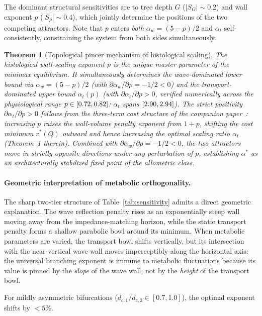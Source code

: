 \documentclass[11pt,a4paper]{article}
\newtheorem{theorem}{Theorem}
\theoremstyle{remark}
\begin{document}
The dominant structural sensitivities are to tree depth $G$ ($|S_G| \sim 0.2$)
and wall exponent $p$ ($|S_p| \sim 0.4$), which jointly determine the positions
of the two competing attractors. Note that $p$ enters \emph{both} $\alpha_w =
(5-p)/2$ and $\alpha_t$ self-consistently, constraining the system from both
sides simultaneously.

\begin{theorem}[Topological pincer mechanism of histological scaling]
\label{thm:master_parameter}
The histological wall-scaling exponent $p$ is the unique master parameter
of the minimax equilibrium. It simultaneously determines the wave-dominated
lower bound via $\alpha_w = (5-p)/2$ (with $\partial\alpha_w/\partial p =
-1/2 < 0$) and the transport-dominated upper bound $\alpha_t(p)$
(with $\partial\alpha_t/\partial p > 0$, verified numerically across the
physiological range $p \in [0.72, 0.82]$: $\alpha_t$ spans
$[2.90, 2.94]$). The strict positivity
$\partial\alpha_t/\partial p > 0$ follows from the
three-term cost structure of the companion paper~\cite{Marchesi2026static}:
increasing $p$ raises the wall-volume penalty exponent from $1+p$,
shifting the cost minimum $r^*(Q)$ outward and hence increasing the
optimal scaling ratio $\alpha_t$ (Theorem~1 therein).
Combined with $\partial\alpha_w/\partial p = -1/2 < 0$, the two attractors
move in strictly opposite directions under any perturbation of $p$,
establishing $\alpha^*$ as an architecturally stabilized fixed point of the
allometric class.
\end{theorem}

\paragraph{Geometric interpretation of metabolic orthogonality.}
The sharp two-tier structure of Table~\ref{tab:sensitivity} admits a direct
geometric explanation. The wave reflection penalty rises as an
exponentially steep wall moving away from the impedance-matching horizon,
while the static transport penalty forms a shallow parabolic bowl around its
minimum. When metabolic parameters are varied, the transport bowl shifts
vertically, but its intersection with the near-vertical wave wall moves
imperceptibly along the horizontal axis: the universal branching exponent
is immune to metabolic fluctuations because its value is pinned by the
\emph{slope} of the wave wall, not by the \emph{height} of the transport
bowl.

For mildly asymmetric bifurcations ($d_{c,1}/d_{c,2} \in [0.7, 1.0]$), the
optimal exponent shifts by $<\!5\%$.
\end{document}
